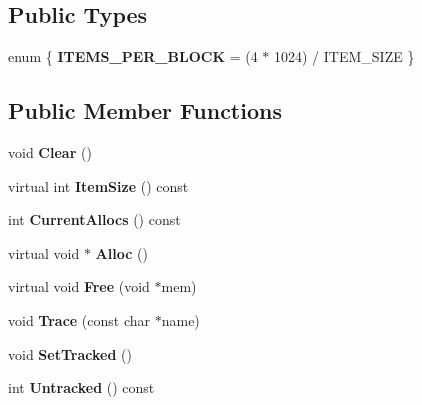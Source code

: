 \subsection*{Public Types}
\begin{DoxyCompactItemize}
\item 
enum \{ {\bfseries I\+T\+E\+M\+S\+\_\+\+P\+E\+R\+\_\+\+B\+L\+O\+CK} = (4 $\ast$ 1024) / I\+T\+E\+M\+\_\+\+S\+I\+ZE
 \}\hypertarget{classtinyxml2_1_1MemPoolT_a04cf45156e6f913f93972869ff8a1d94}{}\label{classtinyxml2_1_1MemPoolT_a04cf45156e6f913f93972869ff8a1d94}

\end{DoxyCompactItemize}
\subsection*{Public Member Functions}
\begin{DoxyCompactItemize}
\item 
void {\bfseries Clear} ()\hypertarget{classtinyxml2_1_1MemPoolT_a22d595caa0e9d23aa080f49ca6475fdd}{}\label{classtinyxml2_1_1MemPoolT_a22d595caa0e9d23aa080f49ca6475fdd}

\item 
virtual int {\bfseries Item\+Size} () const \hypertarget{classtinyxml2_1_1MemPoolT_ada2c610b3dd0fd1ab6df79d8fafd76b6}{}\label{classtinyxml2_1_1MemPoolT_ada2c610b3dd0fd1ab6df79d8fafd76b6}

\item 
int {\bfseries Current\+Allocs} () const \hypertarget{classtinyxml2_1_1MemPoolT_a0573a38b5ca8c0578237bb27ff1a2149}{}\label{classtinyxml2_1_1MemPoolT_a0573a38b5ca8c0578237bb27ff1a2149}

\item 
virtual void $\ast$ {\bfseries Alloc} ()\hypertarget{classtinyxml2_1_1MemPoolT_a810fd2b0caf56b8b688e55f2768f96c7}{}\label{classtinyxml2_1_1MemPoolT_a810fd2b0caf56b8b688e55f2768f96c7}

\item 
virtual void {\bfseries Free} (void $\ast$mem)\hypertarget{classtinyxml2_1_1MemPoolT_a408ce0918e9d3d5e5e1cc4896944875f}{}\label{classtinyxml2_1_1MemPoolT_a408ce0918e9d3d5e5e1cc4896944875f}

\item 
void {\bfseries Trace} (const char $\ast$name)\hypertarget{classtinyxml2_1_1MemPoolT_a47eefbd934ef70d973ea41d41ab5f239}{}\label{classtinyxml2_1_1MemPoolT_a47eefbd934ef70d973ea41d41ab5f239}

\item 
void {\bfseries Set\+Tracked} ()\hypertarget{classtinyxml2_1_1MemPoolT_aee3c611215ae08cce41a940bf2763027}{}\label{classtinyxml2_1_1MemPoolT_aee3c611215ae08cce41a940bf2763027}

\item 
int {\bfseries Untracked} () const \hypertarget{classtinyxml2_1_1MemPoolT_afabb6844c7ef3b064a582568d3147c08}{}\label{classtinyxml2_1_1MemPoolT_afabb6844c7ef3b064a582568d3147c08}

\end{DoxyCompactItemize}
